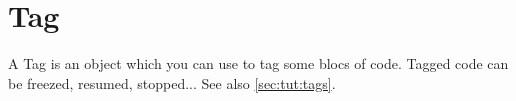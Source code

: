 \section{Tag}

A Tag is an object which you can use to tag some blocs of code.
Tagged code can be freezed, resumed, stopped... See also \autoref{sec:tut:tags}.

